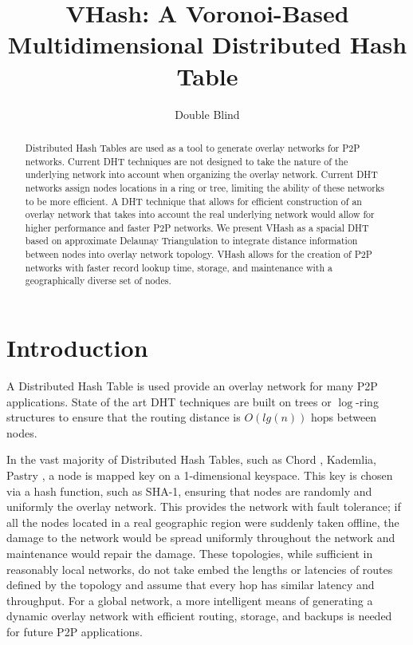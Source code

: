 \documentclass{IEEEtran}
\title{VHash: A Voronoi-Based Multidimensional Distributed Hash Table}
\author{Double Blind}
\date{} %
\begin{document}
\maketitle

\begin{abstract}
Distributed Hash Tables are used as a tool to generate overlay networks for P2P networks. Current DHT techniques are not designed to take the nature of the underlying network into account when organizing the overlay network. Current DHT networks assign nodes locations in a ring or tree, limiting the ability of these networks to be more efficient.
A DHT technique that allows for efficient construction of an overlay network that takes into account the real underlying network would allow for higher performance and faster P2P networks.
We present VHash as a spacial DHT based on approximate Delaunay Triangulation to integrate distance information between nodes into overlay network topology.
VHash allows for the creation of P2P networks with faster record lookup time, storage, and maintenance with a geographically diverse set of nodes.

\end{abstract}
\section{Introduction}
A Distributed Hash Table is used provide an overlay network for many P2P applications. State of the art DHT techniques are built on trees or $\log$-ring structures to ensure that the routing distance is $O(lg(n))$ hops between nodes. 

In the vast majority of Distributed Hash Tables, such as Chord \cite{chord}, Kademlia\cite{kademlia}, Pastry \cite{pastry}, a node is mapped key on a 1-dimensional keyspace.  This key is chosen via a hash function, such as SHA-1, ensuring that nodes are randomly and uniformly the overlay network.
This provides the network with fault tolerance; if all the nodes located in a real geographic region were suddenly taken offline, the damage to the network would be spread uniformly throughout the network and maintenance would repair the damage.  
These topologies, while sufficient in reasonably local networks, do not take embed the lengths or latencies of routes defined by the topology and assume that every hop has similar latency and throughput. For a global network, a more intelligent means of generating a dynamic overlay network with efficient routing, storage, and backups is needed for future P2P applications.
 
\end{document}
